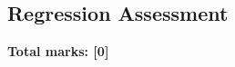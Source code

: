 \documentclass[../s1]{subfiles}
\begin{document}
\subsection*{Regression Assessment}
\thispagestyle{fancy}



\begin{flushright}
\textbf{Total marks: [0]}
\end{flushright}
\end{document}
